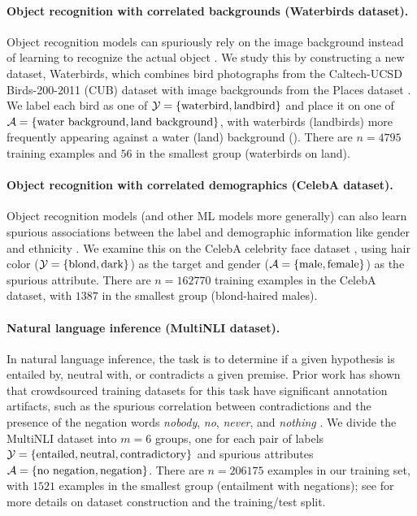 \paragraph{Object recognition with correlated backgrounds (Waterbirds dataset).}
Object recognition models can spuriously rely on the image background instead of learning to recognize the actual object
\citep{ribeiro2016lime}.
We study this by constructing a new dataset, Waterbirds,
which combines bird photographs from the Caltech-UCSD Birds-200-2011 (CUB) dataset \citep{wah2011cub}
with image backgrounds from the Places dataset \citep{zhou2017places}.
We label each bird as one of $\mathcal{Y} = \{\text{waterbird}, \text{landbird}\}$
and place it on one of $\mathcal{A} = \{\text{water background}, \text{land background}\}$,
with waterbirds (landbirds) more frequently appearing against a water (land) background ().
There are $n=4795$ training examples and $56$ in the smallest group
(waterbirds on land).

\paragraph{Object recognition with correlated demographics (CelebA dataset).}
Object recognition models (and other ML models more generally) can also learn spurious associations between the label and
demographic information like gender and ethnicity \citep{buolamwini2018gender}.
We examine this on the CelebA celebrity face dataset \citep{liu2015deep},
using hair color ($\mathcal{Y} = \{\text{blond}, \text{dark}\}$) as the target
and gender ($\mathcal{A} = \{\text{male}, \text{female}\}$) as the spurious attribute.
There are $n=162770$ training examples in the CelebA dataset, with $1387$ in the smallest group (blond-haired males).

\paragraph{Natural language inference (MultiNLI dataset).}
In natural language inference, the task is to determine if a given hypothesis is entailed by, neutral with, or contradicts a given premise.
Prior work has shown that crowdsourced training datasets for this task
have significant annotation artifacts,
such as the spurious correlation between contradictions and the presence of the negation words \emph{nobody}, \emph{no}, \emph{never}, and \emph{nothing}
\citep{gururangan2018annotation}.
We divide the MultiNLI dataset \citep{williams2018broad}
into $m=6$ groups, one for each pair of
labels $\mathcal{Y} = \{\text{entailed}, \text{neutral}, \text{contradictory}\}$ and
spurious attributes $\mathcal{A} = \{\text{no negation}, \text{negation}\}$.
There are $n=206175$ examples in our training set,
with $1521$ examples in the smallest group (entailment with negations);
see  for more details on dataset construction and the training/test split.
